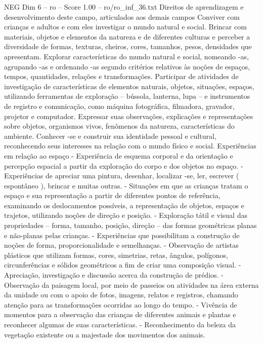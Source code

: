 \begin{textsample}{NEG Dim 6 – ro – Score 1.00 – ro/ro\_inf\_36.txt}  \label{ex:f6_neg_160}
Direitos de aprendizagem e desenvolvimento deste campo, articulados aos demais campos Conviver com crianças e adultos e com eles investigar o mundo natural e social.
Brincar com materiais, objetos e elementos da natureza e de diferentes culturas e perceber a diversidade de formas, texturas, cheiros, cores, tamanhos, pesos, densidades que apresentam.
Explorar características do mundo natural e social, nomeando -as, agrupando -as e ordenando -as segundo critérios relativos às noções de espaços, tempos, quantidades, relações e transformações.
Participar de atividades de investigação de características de elementos naturais, objetos, situações, espaços, utilizando ferramentas de exploração – bússola, lanterna, lupa – e instrumentos de registro e comunicação, como máquina fotográfica, filmadora, gravador, projetor e computador.
Expressar suas observações, explicações e representações sobre objetos, organismos vivos, fenômenos da natureza, características do ambiente.
Conhecer -se e construir sua identidade pessoal e cultural, reconhecendo seus interesses na relação com o mundo físico e social.
Experiências em relação ao espaço - Experiência de esquema corporal e da orientação e percepção espacial a partir da exploração do corpo e dos objetos no espaço. - Experiências de apreciar uma pintura, desenhar, localizar -se, ler, escrever ( espontâneo ), brincar e muitas outras. - Situações em que as crianças tratam o espaço e sua representação a partir de diferentes pontos de referência, examinando os deslocamentos possíveis, a representação de objetos, espaços e trajetos, utilizando noções de direção e posição. - Exploração tátil e visual das propriedades – forma, tamanho, posição, direção – das formas geométricas planas e não-planas pelas crianças. - Experiências que possibilitam a construção de noções de forma, proporcionalidade e semelhanças. - Observação de artistas plásticos que utilizam formas, cores, simetrias, retas, ângulos, polígonos, circunferências e sólidos geométricos a fim de criar uma composição visual. - Apreciação, investigação e discussão acerca da construção de prédios. - Observação da paisagem local, por meio de passeios ou atividades na área externa da unidade ou com o apoio de fotos, imagens, relatos e registros, chamando atenção para as transformações ocorridas ao longo do tempo. - Vivência de momentos para a observação das crianças de diferentes animais e plantas e reconhecer algumas de suas características. - Reconhecimento da beleza da vegetação existente ou a majestade dos movimentos dos animais.

\end{textsample}
